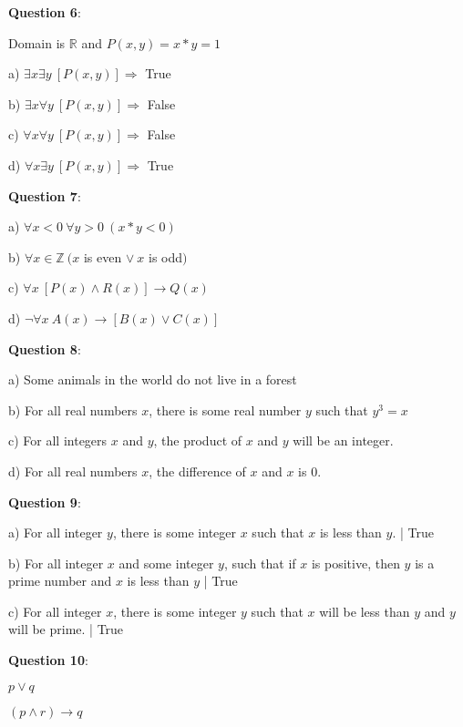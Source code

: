 \documentclass{article} %
\newcommand{\question}[2][]{\begin{flushleft}
        \textbf{Question #1}: \textit{#2}

\end{flushleft}}
\begin{document}
    \question[6]{}

    Domain is $\mathbb{R}$ and $P(x, y) = x * y = 1$

    \hspace{0cm}

    a) $\exists x \exists y\ [P(x, y)] \Rightarrow$ True

    b) $\exists x \forall y\ [P(x, y)] \Rightarrow$ False

    c) $\forall x \forall y\ [P(x, y)] \Rightarrow$ False

    d) $\forall x \exists y\ [P(x, y)] \Rightarrow$ True
    
    \question[7]{}
    
    a) $\forall x < 0\ \forall y > 0\ (x * y < 0)$

    b) $\forall x \in \mathbb{Z}\ (x$ is even $\lor\ x$ is odd$)$

    c) $\forall x\ [P(x) \land R(x)] \rightarrow Q(x)$

    d) $\neg \forall x\ A(x) \rightarrow [B(x) \lor C(x)]$

    \question[8]{}

    a) Some animals in the world do not live in a forest

    b) For all real numbers $x$, there is some real number $y$ such that $y^3 = x$

    c) For all integers $x$ and $y$, the product of $x$ and $y$ will be an integer.

    d) For all real numbers $x$, the difference of $x$ and $x$ is 0. 

    \question[9]{}

    a) For all integer $y$, there is some integer $x$ such that $x$ is less than $y$. | True 

    b) For all integer $x$ and some integer $y$, such that if $x$ is positive, then $y$ is a prime number and \tabto{0.98cm}$x$ is less than $y$ | True

    c) For all integer $x$, there is some integer $y$ such that $x$ will be less than $y$ and $y$ will be prime. \tabto{0.98cm}| True

    \newpage

    \question[10]{}
    
    \centering

    \phantom{`}$p \lor q$ 

    \underline{$(p \land r) \rightarrow q$} %
\end{document}

